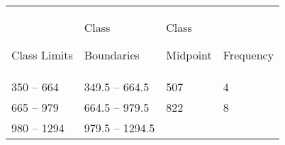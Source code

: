 \documentclass[]{book}
\begin{document}
\begin{longtable}[]{@{}llll@{}}
\toprule
\endhead
\begin{minipage}[t]{0.18\columnwidth}\raggedright
~

Class Limits\strut
\end{minipage} & \begin{minipage}[t]{0.23\columnwidth}\raggedright
Class

Boundaries\strut
\end{minipage} & \begin{minipage}[t]{0.14\columnwidth}\raggedright
Class

Midpoint\strut
\end{minipage} & \begin{minipage}[t]{0.15\columnwidth}\raggedright
~

Frequency\strut
\end{minipage}\tabularnewline
\begin{minipage}[t]{0.18\columnwidth}\raggedright
350 -- 664\strut
\end{minipage} & \begin{minipage}[t]{0.23\columnwidth}\raggedright
349.5 -- 664.5\strut
\end{minipage} & \begin{minipage}[t]{0.14\columnwidth}\raggedright
507\strut
\end{minipage} & \begin{minipage}[t]{0.15\columnwidth}\raggedright
4\strut
\end{minipage}\tabularnewline
\begin{minipage}[t]{0.18\columnwidth}\raggedright
665 -- 979\strut
\end{minipage} & \begin{minipage}[t]{0.23\columnwidth}\raggedright
664.5 -- 979.5\strut
\end{minipage} & \begin{minipage}[t]{0.14\columnwidth}\raggedright
822\strut
\end{minipage} & \begin{minipage}[t]{0.15\columnwidth}\raggedright
8\strut
\end{minipage}\tabularnewline
\begin{minipage}[t]{0.18\columnwidth}\raggedright
980 -- 1294\strut
\end{minipage} & \begin{minipage}[t]{0.23\columnwidth}\raggedright
979.5 -- 1294.5\strut
\end{minipage} & \begin{minipage}[t]{0.14\columnwidth}\raggedright

\end{minipage}
\end{longtable}
\end{document}
